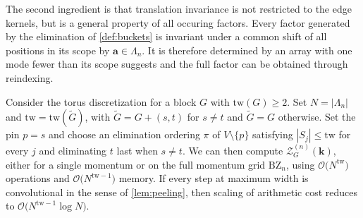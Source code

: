 \documentclass[]{amsart}
\numberwithin{mythm}{section}
\begin{document}
The second ingredient is that translation invariance is not restricted to the
edge kernels, but is a general property of all occuring factors. Every factor generated by the elimination of \cref{def:buckets} is invariant
under a common shift of all positions in its scope by $\bm a\in \Lambda_n$. It is therefore
determined by an array with one mode fewer than its scope suggests and the full factor can be obtained through reindexing.

\begin{theorem}
Consider the torus discretization for a block $G$ with $\mathrm{tw}(G)\ge 2$. Set $N=|\Lambda_n|$ and $\mathrm{tw}=\mathrm{tw}(\tilde G)$, with $\tilde G=G+(s,t)$ for $s\neq t$ and $\tilde G=G$ otherwise. Set the pin $p=s$ and choose an elimination ordering $\pi$ of $V\setminus\{p\}$ satisfying $|S_j|\le\mathrm{tw}$ for every $j$ and eliminating $t$ last when $s\ne t$. We can then compute $\mathcal Z_{G}^{(n)}(\bm k)$, either for a single momentum or on the full momentum grid $\mathrm{BZ}_n$, using $\mathcal O \big(N^{\mathrm{tw}}\big)$ operations and $\mathcal O \big(N^{\mathrm{tw}-1}\big)$ memory. If every step at maximum width is convolutional in the sense of \cref{lem:peeling}, then scaling of arithmetic cost reduces to $\mathcal O \big(N^{\mathrm{tw}-1}\log N\big)$.
\end{theorem}
\end{document}
